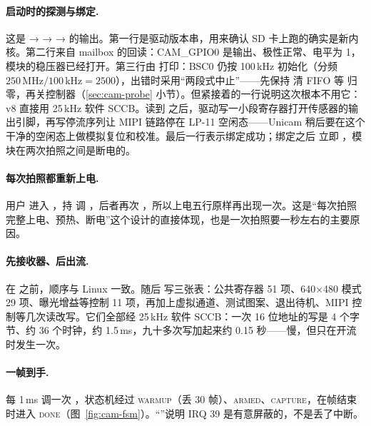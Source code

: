 \paragraph{ 启动时的探测与绑定.} 这是  →  →  →  的输出。第一行是驱动版本串，用来确认 SD 卡上跑的确实是新内核。第二行来自 mailbox 的回读：CAM\_GPIO0 是输出、极性正常、电平为 1，模块的稳压器已经打开。第三行由  打印：BSC0 仍按 100\,kHz 初始化（分频 $250\,\text{MHz}/100\,\text{kHz}=2500$），出错时采用“两段式中止”——先保持  清 FIFO 等  归零，再关控制器（\ref{sec:cam-probe} 小节）。但紧接着的一行说明这次根本不用它：v8 直接用 25\,kHz 软件 SCCB。读到  之后，驱动写一小段寄存器打开传感器的输出引脚，再写停流序列让 MIPI 链路停在 LP-11 空闲态——Unicam 稍后要在这个干净的空闲态上做模拟复位和校准。最后一行表示绑定成功；绑定之后  立即 ，模块在两次拍照之间是断电的。

\paragraph{ 每次拍照都重新上电.} 用户  进入 ，持  调 ，后者再次 ，所以上电五行原样再出现一次。这是“每次拍照完整上电、预热、断电”这个设计的直接体现，也是一次拍照要一秒左右的主要原因。

\paragraph{ 先接收器、后出流.}  在  之前，顺序与 Linux 一致。随后  写三张表：公共寄存器 51 项、640$\times$480 模式 29 项、曝光增益等控制 11 项，再加上虚拟通道、测试图案、退出待机、MIPI 控制等几次读改写。它们全部经 25\,kHz 软件 SCCB：一次 16 位地址的写是 4 个字节、约 36 个时钟，约 1.5\,ms，九十多次写加起来约 0.15 秒——慢，但只在开流时发生一次。

\paragraph{ 一帧到手.}  每 1\,ms 调一次 ，状态机经过 \textsc{warmup}（丢 30 帧）、\textsc{armed}、\textsc{capture}，在帧结束时进入 \textsc{done}（图~\ref{fig:cam-fsm}）。“”说明 IRQ 39 是有意屏蔽的，不是丢了中断。

